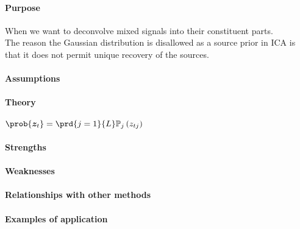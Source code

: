 \paragraph{Purpose}
When we want to deconvolve mixed signals into their constituent parts.\\
The reason the Gaussian distribution is disallowed as a source prior in ICA is that 
it does not permit unique recovery of the sources.

\paragraph{Assumptions}
\paragraph{Theory}
$\prob{\bm{z}_{t}} = \prd{j=1}{L}\mathbb{P}_{j}\left(z_{tj}\right)$
\paragraph{Strengths}
\paragraph{Weaknesses}
\paragraph{Relationships with other methods}
\paragraph{Examples of application}

